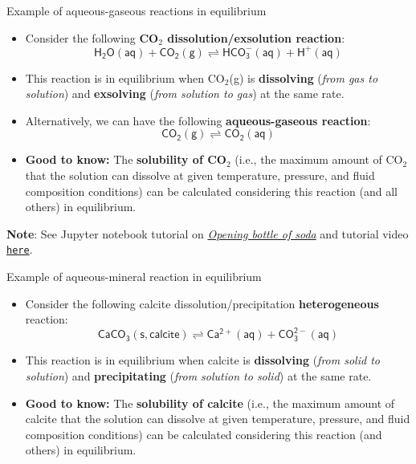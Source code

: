 %
\begin{frame}{Example of aqueous-gaseous reactions in equilibrium}
	\begin{itemize}
		\item Consider the following \alert{\bf CO$_{2}$ dissolution/exsolution reaction}:
	\[
	\mathsf{H_2O(aq) + CO_{2}(g) \rightleftharpoons HCO^-_3(aq) + H^+(aq)}
	\]
\vskip -10pt
\pause
\item This reaction is in equilibrium when CO$_{2}$(g) is \textbf{dissolving
}(\emph{from gas to solution}) and \textbf{exsolving} (\emph{from
solution to gas}) at the same rate. 
	\pause
\item Alternatively, we can have the following \alert{\bf aqueous-gaseous reaction}:
%
\[
\mathsf{CO_{2}(g) \rightleftharpoons CO_2(aq)}
\]
\vskip -10pt
%
	\pause
\item \alert{\textbf{Good to know:}} The \textbf{solubility of
CO$_{2}$} (i.e., the maximum amount of CO$_{2}$ that the solution
can dissolve at given temperature, pressure, and fluid composition
conditions) can be calculated considering this reaction (and all others)
in equilibrium.
\end{itemize}
%
	\pause
\alert{\textbf{Note}}: See Jupyter notebook tutorial on  \href{https://github.com/mtsveta/reaktoro-jupyter/blob/geofluids-examples/tutorial/eq.co2-solubility-in-water.ipynb}{\textcolor{indigo(dye)}{\it Opening bottle of soda}} and tutorial video \href{https://polybox.ethz.ch/index.php/s/qStBnxUnry648U5}{\textcolor{indigo(dye)}{\tt here}}.
%
\end{frame}
%
%
\begin{frame}[<+->]{Example of aqueous-mineral reaction in equilibrium}
\begin{itemize}
\item Consider the following calcite dissolution/precipitation \textbf{heterogeneous} reaction:
\[
\mathrm{\mathsf{CaCO_{3}(s,calcite) \rightleftharpoons Ca^{2+}(aq)+CO_{3}^{2-}(aq)}}
\]
\item This reaction is in equilibrium when calcite is \textbf{dissolving
}(\emph{from solid to solution}) and \textbf{precipitating} (\emph{from
solution to solid}) at the same rate. 
\item \textbf{\alert{\textbf{Good to know:}}} The \textbf{solubility of
calcite} (i.e., the maximum amount of calcite that the solution can
dissolve at given temperature, pressure, and fluid composition conditions)
can be calculated considering this reaction (and others) in equilibrium.
\end{itemize}
\end{frame}

